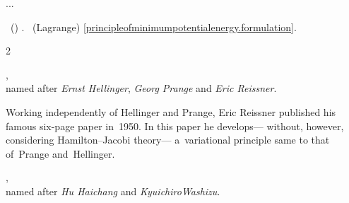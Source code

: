 ...

   ~() .
    ~(Lagrange)  \eqref{principleofminimumpotentialenergy.formulation}.



\label{para:mixedvariationalprinciples}

\vspace{.2em}\begin{changemargin}{2\parindent}{\parindent}
\bgroup %
\setlength{\parindent}{\negparindent}
\small

\hspace{\parindent}\href{https://en.wikiversity.org/wiki/Introduction_to_Elasticity/Hellinger-Reissner_principle}{},\\
named after \emph{Ernst Hellinger}, \emph{Georg Prange} and \emph{Eric Reissner}.
\par

\nopagebreak\vspace{.16em}
{\scriptsize \noindent Working independently of Hellinger and Prange, Eric Reissner published his famous six\hbox{-}page paper  in~1950. In this paper he develops\:--- without, however, considering Hamilton\hbox{--}Jacobi theory\:--- a~variational principle same to that of~Prange and~Hellinger.\par}

\nopagebreak\vspace{.32em}
\href{https://en.wikiversity.org/wiki/Introduction_to_Elasticity/Hu-Washizu_principle}{},\\
named after \emph{Hu Haichang} and \emph{Kyuichiro\;Washizu}.
\par
\egroup
\nopagebreak\vspace{.1em}
\end{changemargin}

